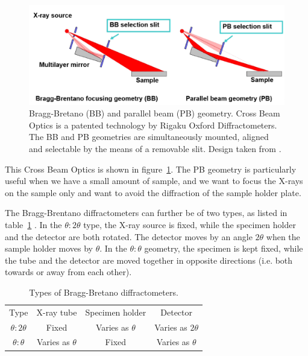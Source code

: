 	\begin{figure}
		\centering
		\includegraphics[width=\textwidth]{cross_beam_optics.png}
		\caption{\label{fig:cross_beam_optics}Bragg-Bretano (BB) and parallel beam (PB) geometry. Cross Beam Optics is a patented technology by Rigaku Oxford Diffractometers. The BB and PB geometries are simultaneously mounted, aligned and selectable by the means of a removable slit. Design taken from \cite{Chowdhury2022}.}
	\end{figure}
	
	This Cross Beam Optics is shown in figure~\ref{fig:cross_beam_optics}. The PB geometry is particularly useful when we have a small amount of sample, and we want to focus the X-rays on the sample only and want to avoid the diffraction of the sample holder plate.
	
	 The Bragg-Brentano diffractometers can further be of two types, as listed in table~\ref{tab:bragg_bretano}
	 . In the $\theta : 2\theta$ type, the X-ray source is fixed, while the specimen holder and the detector are both rotated. The detector moves by an angle $2\theta$ when the sample holder moves by $\theta.$ In the $\theta : \theta$ geometry, the specimen is kept fixed, while the tube and the detector are moved together in opposite directions (i.e. both towards or away from each other).
	 
	\begin{table}
	
		\centering
		
		\caption{\label{tab:bragg_bretano}Types of Bragg-Bretano diffractometers.}
		\begin{tabular}{|c|c|c|c|}
		
			\hline
			
			Type & X-ray tube & Specimen holder & Detector \\
			
			\hhline{|=|=|=|=|}
			
			$\theta : 2\theta$ & Fixed & Varies as $\theta$ & Varies as $2\theta$ \\
			
			\hline
			
			$\theta : \theta$ & Varies as $\theta$ & Fixed & Varies as $\theta$ \\
			
			\hline
		
		\end{tabular}
	\end{table}
	
